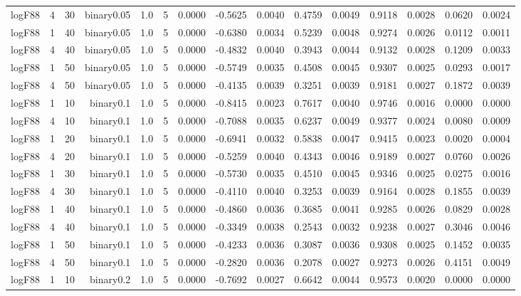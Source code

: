 \begin{longtable}{rrrrrrrrrrrrrrr}
  logF88 & 4 & 30 & binary0.05 & 1.0 & 5 & 0.0000 & -0.5625 & 0.0040 & 0.4759 & 0.0049 & 0.9118 & 0.0028 & 0.0620 & 0.0024 \\ 
  logF88 & 1 & 40 & binary0.05 & 1.0 & 5 & 0.0000 & -0.6380 & 0.0034 & 0.5239 & 0.0048 & 0.9274 & 0.0026 & 0.0112 & 0.0011 \\ 
  logF88 & 4 & 40 & binary0.05 & 1.0 & 5 & 0.0000 & -0.4832 & 0.0040 & 0.3943 & 0.0044 & 0.9132 & 0.0028 & 0.1209 & 0.0033 \\ 
  logF88 & 1 & 50 & binary0.05 & 1.0 & 5 & 0.0000 & -0.5749 & 0.0035 & 0.4508 & 0.0045 & 0.9307 & 0.0025 & 0.0293 & 0.0017 \\ 
  logF88 & 4 & 50 & binary0.05 & 1.0 & 5 & 0.0000 & -0.4135 & 0.0039 & 0.3251 & 0.0039 & 0.9181 & 0.0027 & 0.1872 & 0.0039 \\ 
  logF88 & 1 & 10 & binary0.1 & 1.0 & 5 & 0.0000 & -0.8415 & 0.0023 & 0.7617 & 0.0040 & 0.9746 & 0.0016 & 0.0000 & 0.0000 \\ 
  logF88 & 4 & 10 & binary0.1 & 1.0 & 5 & 0.0000 & -0.7088 & 0.0035 & 0.6237 & 0.0049 & 0.9377 & 0.0024 & 0.0080 & 0.0009 \\ 
  logF88 & 1 & 20 & binary0.1 & 1.0 & 5 & 0.0000 & -0.6941 & 0.0032 & 0.5838 & 0.0047 & 0.9415 & 0.0023 & 0.0020 & 0.0004 \\ 
  logF88 & 4 & 20 & binary0.1 & 1.0 & 5 & 0.0000 & -0.5259 & 0.0040 & 0.4343 & 0.0046 & 0.9189 & 0.0027 & 0.0760 & 0.0026 \\ 
  logF88 & 1 & 30 & binary0.1 & 1.0 & 5 & 0.0000 & -0.5730 & 0.0035 & 0.4510 & 0.0045 & 0.9346 & 0.0025 & 0.0275 & 0.0016 \\ 
  logF88 & 4 & 30 & binary0.1 & 1.0 & 5 & 0.0000 & -0.4110 & 0.0040 & 0.3253 & 0.0039 & 0.9164 & 0.0028 & 0.1855 & 0.0039 \\ 
  logF88 & 1 & 40 & binary0.1 & 1.0 & 5 & 0.0000 & -0.4860 & 0.0036 & 0.3685 & 0.0041 & 0.9285 & 0.0026 & 0.0829 & 0.0028 \\ 
  logF88 & 4 & 40 & binary0.1 & 1.0 & 5 & 0.0000 & -0.3349 & 0.0038 & 0.2543 & 0.0032 & 0.9238 & 0.0027 & 0.3046 & 0.0046 \\ 
  logF88 & 1 & 50 & binary0.1 & 1.0 & 5 & 0.0000 & -0.4233 & 0.0036 & 0.3087 & 0.0036 & 0.9308 & 0.0025 & 0.1452 & 0.0035 \\ 
  logF88 & 4 & 50 & binary0.1 & 1.0 & 5 & 0.0000 & -0.2820 & 0.0036 & 0.2078 & 0.0027 & 0.9273 & 0.0026 & 0.4151 & 0.0049 \\ 
  logF88 & 1 & 10 & binary0.2 & 1.0 & 5 & 0.0000 & -0.7692 & 0.0027 & 0.6642 & 0.0044 & 0.9573 & 0.0020 & 0.0000 & 0.0000 \\ 

\end{longtable}
